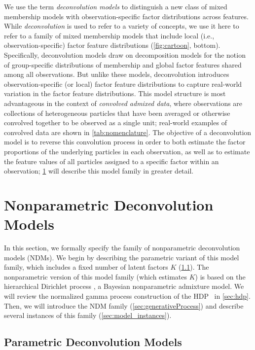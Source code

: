 \documentclass[twoside,11pt]{article}
\begin{document}
We use the term \emph{deconvolution models} to distinguish a new class of mixed membership models with observation-specific factor distributions across features.  While \emph{deconvolution} is used to refer to a variety of concepts, we use it here to refer to a family of mixed membership models that include local (i.e., observation-specific) factor feature distributions (\cref{fig:cartoon}, bottom).  Specifically, deconvolution models draw on decomposition models for the notion of group-specific distributions of membership and global factor features shared among all observations.  But unlike these models, deconvolution introduces observation-specific (or local) factor feature distributions to capture real-world variation in the factor feature distributions.
This model structure is most advantageous in the context of \emph{convolved admixed data}, where observations are collections of heterogeneous particles that have been averaged or otherwise convolved together to be observed as a single unit; real-world examples of convolved data are shown in \cref{tab:nomenclature}.  The objective of a deconvolution model is to reverse this convolution process in order to both estimate the factor proportions of the underlying particles in each observation, as well as to estimate the feature values of all particles assigned to a specific factor within an observation; \cref{sec:model_family} will describe this model family in greater detail. 

\section{Nonparametric Deconvolution Models}
\label{sec:model_family}
In this section, we formally specify the family of nonparametric deconvolution models (NDMs).  We begin by describing the parametric variant of this model family, which includes a fixed number of latent factors $K$ (\cref{sec:parametric_model_family}).  The nonparametric version of this model family (which estimates $K$) is based on the hierarchical Dirichlet process \citep[HDP,][]{Teh:2006}, a Bayesian nonparametric admixture model. We will review the normalized gamma process construction of the HDP~\citep{Paisley:2012} in \cref{sec:hdp}. Then, we will introduce the NDM family (\cref{sec:generativeProcess}) and describe several instances of this family (\cref{sec:model_instances}).

\subsection{Parametric Deconvolution Models}
\label{sec:parametric_model_family}
\end{document}
